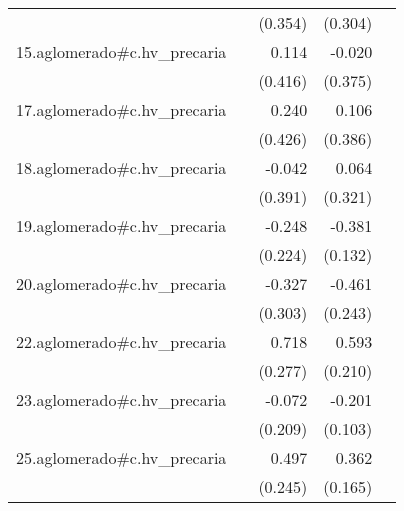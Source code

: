 {\begin{longtable}{l*{4}{D{.}{.}{-1}}}
            &                     &     (0.354)         &     (0.304)         &                     \\
\addlinespace
15.aglomerado#c.hv\_precaria&                     &       0.114         &      -0.020         &                     \\
            &                     &     (0.416)         &     (0.375)         &                     \\
\addlinespace
17.aglomerado#c.hv\_precaria&                     &       0.240         &       0.106         &                     \\
            &                     &     (0.426)         &     (0.386)         &                     \\
\addlinespace
18.aglomerado#c.hv\_precaria&                     &      -0.042         &       0.064         &                     \\
            &                     &     (0.391)         &     (0.321)         &                     \\
\addlinespace
19.aglomerado#c.hv\_precaria&                     &      -0.248         &      -0.381\sym{**} &                     \\
            &                     &     (0.224)         &     (0.132)         &                     \\
\addlinespace
20.aglomerado#c.hv\_precaria&                     &      -0.327         &      -0.461         &                     \\
            &                     &     (0.303)         &     (0.243)         &                     \\
\addlinespace
22.aglomerado#c.hv\_precaria&                     &       0.718\sym{**} &       0.593\sym{**} &                     \\
            &                     &     (0.277)         &     (0.210)         &                     \\
\addlinespace
23.aglomerado#c.hv\_precaria&                     &      -0.072         &      -0.201         &                     \\
            &                     &     (0.209)         &     (0.103)         &                     \\
\addlinespace
25.aglomerado#c.hv\_precaria&                     &       0.497\sym{*}  &       0.362\sym{*}  &                     \\
            &                     &     (0.245)         &     (0.165)         &                     \\

\end{longtable}}
